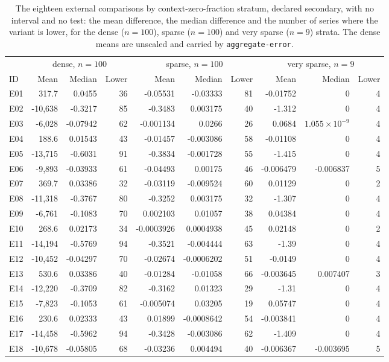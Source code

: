 \begin{table}[htbp]
\centering\footnotesize\setlength{\tabcolsep}{3.5pt}
\caption{The eighteen external comparisons by context-zero-fraction stratum, declared secondary, with no
interval and no test: the mean difference, the median difference and the number of series where the variant
is lower, for the dense ($n = 100$), sparse ($n = 100$) and very sparse ($n = 9$) strata. The dense means
are unscaled and carried by \texttt{aggregate-error}.}
\label{tab:s2strata}
\begin{tabular}{lrrrrrrrrr}
\toprule
 & \multicolumn{3}{c}{dense, $n = 100$} & \multicolumn{3}{c}{sparse, $n = 100$} & \multicolumn{3}{c}{very sparse, $n = 9$} \\
\cmidrule(lr){2-4} \cmidrule(lr){5-7} \cmidrule(lr){8-10}
ID & Mean & Median & Lower & Mean & Median & Lower & Mean & Median & Lower \\
\midrule
E01 & 317.7 & 0.0455 & 36 & -0.05531 & -0.03333 & 81 & -0.01752 & 0 & 4 \\
E02 & -10,638 & -0.3217 & 85 & -0.3483 & 0.003175 & 40 & -1.312 & 0 & 4 \\
E03 & -6,028 & -0.07942 & 62 & -0.001134 & 0.0266 & 26 & 0.0684 & $1.055 \times 10^{-9}$ & 4 \\
E04 & 188.6 & 0.01543 & 43 & -0.01457 & -0.003086 & 58 & -0.01108 & 0 & 4 \\
E05 & -13,715 & -0.6031 & 91 & -0.3834 & -0.001728 & 55 & -1.415 & 0 & 4 \\
E06 & -9,893 & -0.03933 & 61 & -0.04493 & 0.00175 & 46 & -0.006479 & -0.006837 & 5 \\
E07 & 369.7 & 0.03386 & 32 & -0.03119 & -0.009524 & 60 & 0.01129 & 0 & 2 \\
E08 & -11,318 & -0.3767 & 80 & -0.3252 & 0.003175 & 32 & -1.307 & 0 & 4 \\
E09 & -6,761 & -0.1083 & 70 & 0.002103 & 0.01057 & 38 & 0.04384 & 0 & 4 \\
E10 & 268.6 & 0.02173 & 34 & -0.0003926 & 0.0004938 & 45 & 0.02148 & 0 & 2 \\
E11 & -14,194 & -0.5769 & 94 & -0.3521 & -0.004444 & 63 & -1.39 & 0 & 4 \\
E12 & -10,452 & -0.04297 & 70 & -0.02674 & -0.0006202 & 51 & -0.0149 & 0 & 4 \\
E13 & 530.6 & 0.03386 & 40 & -0.01284 & -0.01058 & 66 & -0.003645 & 0.007407 & 3 \\
E14 & -12,220 & -0.3709 & 82 & -0.3162 & 0.01323 & 29 & -1.31 & 0 & 4 \\
E15 & -7,823 & -0.1053 & 61 & -0.005074 & 0.03205 & 19 & 0.05747 & 0 & 4 \\
E16 & 230.6 & 0.02333 & 43 & 0.01899 & -0.0008642 & 54 & -0.003841 & 0 & 4 \\
E17 & -14,458 & -0.5962 & 94 & -0.3428 & -0.003086 & 62 & -1.409 & 0 & 4 \\
E18 & -10,678 & -0.05805 & 68 & -0.03236 & 0.004494 & 40 & -0.006367 & -0.003695 & 5 \\
\bottomrule
\end{tabular}
\end{table}

